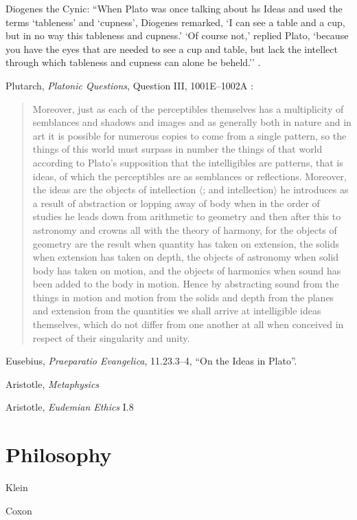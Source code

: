 \documentclass{article}
\theoremstyle{definition}
\begin{document}
Diogenes the Cynic: ``When Plato was once talking about hs Ideas and used the terms `tableness' and `cupness', Diogenes remarked, `I can see a table and a cup, but in no way
this tableness and cupness.' `Of course not,' replied Plato, `because you have the eyes that are needed to see a cup and table, but lack the intellect through which tableness
and cupness can alone be beheld.'' \cite[pp.~32--33, no. 121]{cynic}.


Plutarch, {\em Platonic Questions}, Question III, 1001E--1002A \cite[pp.~37--39]{LCL427}:

\begin{quote}
Moreover, just as each of the perceptibles themselves
has a multiplicity of semblances and shadows
and images and as generally both in nature and in
art it is possible for numerous copies to come from a
single pattern, so the things of this world must surpass
in number the things of that world according to
Plato's supposition that the intelligibles are patterns,
that is ideas, of which the perceptibles are as semblances
or reflections. Moreover, the ideas are the
objects of intellection {$\langle$}; and intellection{$\rangle$} he introduces
as a result of abstraction or lopping away
of body when in the order of studies he leads down
from arithmetic to geometry and then after this to
astronomy and crowns all with the theory of harmony,
for the objects of geometry are the result
when quantity has taken on extension, the solids
when extension has taken on depth, the objects of
astronomy when solid body has taken on motion, 
and the objects of harmonics when sound has been
added to the body in motion. Hence by abstracting
sound from the things in motion and motion from the
solids and depth from the planes and extension from
the quantities we shall arrive at intelligible ideas
themselves, which do not differ from one another
at all when conceived in respect of their singularity 
and unity.
\end{quote}

Eusebius, {\em Praeparatio Evangelica}, 11.23.3--4, ``On the Ideas in Plato''.

Aristotle, {\em Metaphysics}

Aristotle, {\em Eudemian Ethics} I.8


\section{Philosophy}
Klein \cite{klein}

Coxon \cite{coxon}
\end{document}

